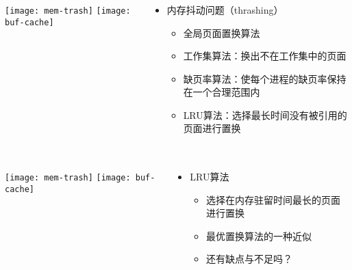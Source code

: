 \begin{frame}[plain]
	\frametitle{ }
	\begin{columns}
		\begin{column}{.4\textwidth}
			\centering
			\texttt{[image: mem-trash]}
			\texttt{[image: buf-cache]}
		\end{column}
		
		\begin{column}{.6\textwidth}
			
			\begin{itemize}\Large
				\item 内存抖动问题（thrashing）
				\begin{itemize}\large
					\item 全局页面置换算法
					\item 工作集算法：换出不在工作集中的页面
					\item 缺页率算法：使每个进程的缺页率保持在一个合理范围内
					\item LRU算法：选择最长时间没有被引用的页面进行置换
				\end{itemize}
			\end{itemize}
			
		\end{column}
		
		
	\end{columns}
\end{frame}


\begin{frame}[plain]
	\frametitle{ }
	\begin{columns}
		\begin{column}{.4\textwidth}
			\centering
			\texttt{[image: mem-trash]}
			\texttt{[image: buf-cache]}
			
		\end{column}
		
		\begin{column}{.6\textwidth}
			
			\begin{itemize}\Large
				\item LRU算法
				\begin{itemize}\large

					\item 选择在内存驻留时间最长的页面进行置换
					\item 最优置换算法的一种近似
					\item 还有缺点与不足吗？
				\end{itemize}
			\end{itemize}
			
		\end{column}
		
		
	\end{columns}
\end{frame}


